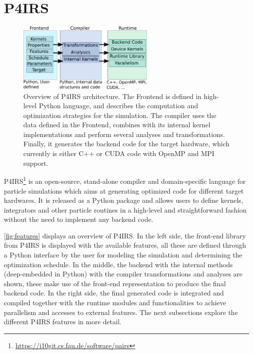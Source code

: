 \documentclass[Afour,sageh,times]{sagej}
\begin{document}
\section{P4IRS}
\label{sec:pairs}


\begin{figure}[htb]
  \centering
  \includegraphics[width=0.6\textwidth]{pairs_overview.png}
  \caption{Overview of P4IRS architecture. The Frontend is defined in high-level Python language, and describes the computation and optimization strategies for the simulation. The compiler uses the data defined in the Frontend, combines with its internal kernel implementations and perform several analyses and transformations. Finally, it generates the backend code for the target hardware, which currently is either C++ or CUDA code with OpenMP and MPI support.}
  \label{fig:features}
\end{figure}

P4IRS\footnote{\url{https://i10git.cs.fau.de/software/pairs}} is an open-source, stand-alone compiler and domain-specific language for particle simulations which aims at generating optimized code for different target hardwares.
It is released as a Python package and allows users to define kernels, integrators and other particle routines in a high-level and straightforward fashion without the need to implement any backend code.

\autoref{fig:features} displays an overview of P4IRS.
In the left side, the front-end library from P4IRS is displayed with the available features, all these are defined through a Python interface by the user for modeling the simulation and determining the optimization schedule.
In the middle, the backend with the internal methods (deep-embedded in Python) with the compiler transformations and analyses are shown, these make use of the front-end representation to produce the final backend code.
In the right side, the final generated code is integrated and compiled together with the runtime modules and functionalities to achieve parallelism and accesses to external features.
The next subsections explore the different P4IRS features in more detail.
\end{document}
